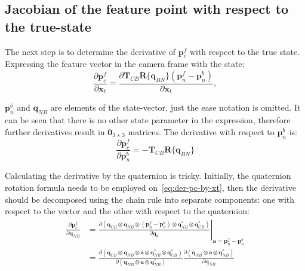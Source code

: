 \subsection*{Jacobian of the feature point with respect to the true-state} 

The next step is to determine the derivative of $\mathbf{p}_c^f$ with respect to the true state. Expressing the feature vector in the camera frame with the state:
\begin{equation}
    \frac{\partial\mathbf{p}_c^f}{\partial\mathbf{x}_t}=
    \frac{\partial\mathbf{T}_{CB}\mathbf{R}\{\mathbf{q}_{BN}\}(\mathbf{p}_n^f-\mathbf{p}_n^b)}{\partial\mathbf{x}_t},
    \label{eq:der-pc-by-xt}
\end{equation}

$\mathbf{p}_n^b$ and $\mathbf{q}_{NB}$ are elements of the state-vector, just the ease notation is omitted. It can be seen that there is no other state parameter in the expression, therefore further derivatives result in $\mathbf{0}_{3\times 3}$ matrices. The derivative with respect to $\mathbf{p}_n^b$ is:
\begin{equation}
    \frac{\partial\mathbf{p}_c^f}{\partial\mathbf{p}_n^b}=-\mathbf{T}_{CB}\mathbf{R}\{\mathbf{q}_{BN}\}
\end{equation}

Calculating the derivative by the quaternion is tricky. Initially, the quaternion rotation formula needs to be employed on~\eqref{eq:der-pc-by-xt}, then the derivative should be decomposed using the chain rule into separate components: one with respect to the vector and the other with respect to the quaternion:
\begin{equation}
\begin{aligned}
    \frac{\partial\mathbf{p}_c^f}{\partial\mathbf{q}_{NB}}&=\left.
    \frac{\partial\left(\mathbf{q}_{CB}\otimes\mathbf{q}_{NB}\otimes(\mathbf{p}_n^f-\mathbf{p}_n^b) \otimes\mathbf{q}_{NB}^*\otimes\mathbf{q}_{CB}^*\right)}{\partial\mathbf{q}_n} \right\vert_{\mathbf{a}=\mathbf{p}_n^f-\mathbf{p}_n^b} \\ 
    &=\frac{\partial\left(\mathbf{q}_{CB}\otimes\mathbf{q}_{NB}\otimes\mathbf{a} \otimes\mathbf{q}_{NB}^*\otimes\mathbf{q}_{CB}^*\right)}{\partial\left(\mathbf{q}_{NB}\otimes\mathbf{a} \otimes\mathbf{q}_{NB}^*\right)}
    \frac{\partial\left(\mathbf{q}_{NB}\otimes\mathbf{a}\otimes\mathbf{q}_{NB}^*\right)}{\partial\mathbf{q}_{NB}}
\end{aligned}
\end{equation}

